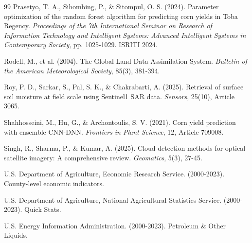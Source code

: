 \documentclass[10pt,twocolumn]{article}
\begin{document}
\begin{thebibliography}{99}
Prasetyo, T. A., Sihombing, P., \& Sitompul, O. S. (2024). Parameter optimization of the random forest algorithm for predicting corn yields in Toba Regency. \textit{Proceedings of the 7th International Seminar on Research of Information Technology and Intelligent Systems: Advanced Intelligent Systems in Contemporary Society}, pp. 1025-1029. ISRITI 2024.

Rodell, M., et al. (2004). The Global Land Data Assimilation System. \textit{Bulletin of the American Meteorological Society}, 85(3), 381-394.

Roy, P. D., Sarkar, S., Pal, S. K., \& Chakrabarti, A. (2025). Retrieval of surface soil moisture at field scale using Sentinel1 SAR data. \textit{Sensors}, 25(10), Article 3065.

Shahhosseini, M., Hu, G., \& Archontoulis, S. V. (2021). Corn yield prediction with ensemble CNN-DNN. \textit{Frontiers in Plant Science}, 12, Article 709008.

Singh, R., Sharma, P., \& Kumar, A. (2025). Cloud detection methods for optical satellite imagery: A comprehensive review. \textit{Geomatics}, 5(3), 27-45.

U.S. Department of Agriculture, Economic Research Service. (2000-2023). County-level economic indicators.

U.S. Department of Agriculture, National Agricultural Statistics Service. (2000-2023). Quick Stats.

U.S. Energy Information Administration. (2000-2023). Petroleum \& Other Liquids.

\end{thebibliography}
\end{document}
